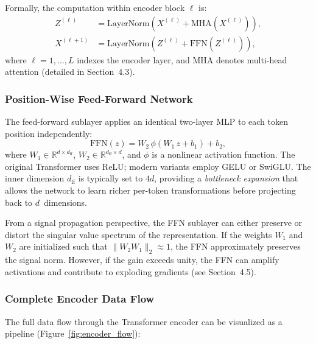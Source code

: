 \documentclass[12pt, a4paper]{article}
\begin{document}
Formally, the computation within encoder block $\ell$ is:
\begin{align}
    Z^{(\ell)} &= \text{LayerNorm}\!\left(X^{(\ell)}
        + \text{MHA}\!\left(X^{(\ell)}\right)\right),
        \label{eq:block_attn_full} \\
    X^{(\ell+1)} &= \text{LayerNorm}\!\left(Z^{(\ell)}
        + \text{FFN}\!\left(Z^{(\ell)}\right)\right),
        \label{eq:block_ffn_full}
\end{align}
where $\ell = 1, \ldots, L$ indexes the encoder layer, and MHA denotes
multi-head attention (detailed in Section~4.3).

\subsubsection{Position-Wise Feed-Forward Network}

The feed-forward sublayer applies an identical two-layer MLP to each
token position independently:
\begin{equation}
    \text{FFN}(z) = W_2\, \phi(W_1\, z + b_1) + b_2,
    \label{eq:ffn}
\end{equation}
where $W_1 \in \mathbb{R}^{d \times d_{\text{ff}}}$,
$W_2 \in \mathbb{R}^{d_{\text{ff}} \times d}$, and $\phi$ is a
nonlinear activation function. The original Transformer uses ReLU;
modern variants employ GELU or SwiGLU. The inner dimension
$d_{\text{ff}}$ is typically set to $4d$, providing a
\textit{bottleneck expansion} that allows the network to learn
richer per-token transformations before projecting back to
$d$~dimensions.

From a signal propagation perspective, the FFN sublayer can either
preserve or distort the singular value spectrum of the representation.
If the weights $W_1$ and $W_2$ are initialized such that
$\|W_2 W_1\|_2 \approx 1$, the FFN approximately preserves the
signal norm. However, if the gain exceeds unity, the FFN can amplify
activations and contribute to exploding gradients (see Section~4.5).

\subsubsection{Complete Encoder Data Flow}

The full data flow through the Transformer encoder can be visualized as
a pipeline (Figure~\ref{fig:encoder_flow}):
\end{document}
